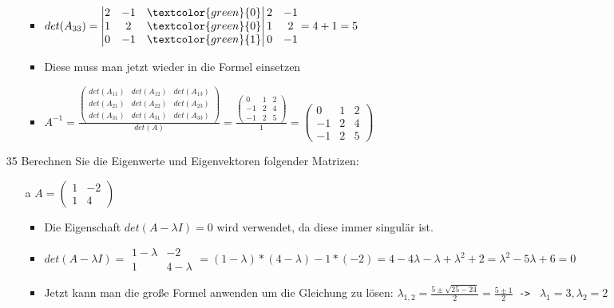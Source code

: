 \documentclass{article}
\begin{document}
\begin{itemize}
\begin{itemize}
\begin{itemize}
				\item{$det(A_{33})=\begin{vmatrix} 2 & -1 & \textcolor{green}{0} \\ 1 & 2 & \textcolor{green}{0} \\ 0 & -1 & \textcolor{green}{1} \end{vmatrix}\begin{matrix} 2 & -1 \\ 1 & 2 \\ 0 & -1 \end{matrix}=4+1=5$}
				\item{Diese muss man jetzt wieder in die Formel einsetzen}
				\item{$A^{-1}=\frac{\begin{pmatrix} det(A_{11}) & det(A_{12}) & det(A_{13}) \\ det(A_{21}) & det(A_{22}) & det(A_{23}) \\ det(A_{31}) & det(A_{31}) & det(A_{33})\end{pmatrix}}{det(A)}=\frac{\begin{pmatrix} 0 & 1 & 2 \\ -1 & 2 & 4 \\ -1 & 2 & 5 \end{pmatrix}}{1}=\begin{pmatrix} 0 & 1 & 2 \\ -1 & 2 & 4 \\ -1 & 2 & 5 \end{pmatrix}$}
			\end{itemize}
		\end{itemize}
		\item[35]{Berechnen Sie die Eigenwerte und Eigenvektoren folgender Matrizen:}
		\begin{itemize}
			\item[a]{$A=\begin{pmatrix} 1 & -2 \\ 1 & 4 \end{pmatrix}$}
			\begin{itemize}
				\item{Die Eigenschaft $det(A-\lambda I)=0$ wird verwendet, da diese immer singulär ist.}
				\item{$det(A-\lambda I)=\begin{matrix} 1-\lambda & -2 \\ 1 & 4-\lambda \end{matrix}=(1-\lambda)*(4-\lambda)-1*(-2)=4-4\lambda-\lambda+\lambda^2+2=\lambda^2-5\lambda+6=0$}
				\item{Jetzt kann man die große Formel anwenden um die Gleichung zu lösen: $\lambda_{1,2}=\frac{5\pm\sqrt{25-24}}{2}=\frac{5\pm1}{2}$\texttt{ -> } $\lambda_1=3, \lambda_2=2$}

\end{itemize}
\end{itemize}
\end{itemize}
\end{document}
